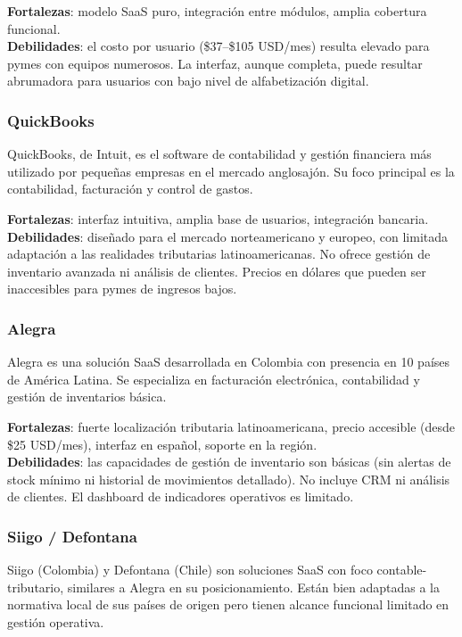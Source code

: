 \textbf{Fortalezas}: modelo SaaS puro, integración entre módulos, amplia cobertura funcional.\\
\textbf{Debilidades}: el costo por usuario (\$37--\$105 USD/mes) resulta elevado para pymes con equipos numerosos. La interfaz, aunque completa, puede resultar abrumadora para usuarios con bajo nivel de alfabetización digital.

\subsubsection{QuickBooks}\label{quickbooks}

QuickBooks, de Intuit, es el software de contabilidad y gestión financiera más utilizado por pequeñas empresas en el mercado anglosajón. Su foco principal es la contabilidad, facturación y control de gastos.

\textbf{Fortalezas}: interfaz intuitiva, amplia base de usuarios, integración bancaria.\\
\textbf{Debilidades}: diseñado para el mercado norteamericano y europeo, con limitada adaptación a las realidades tributarias latinoamericanas. No ofrece gestión de inventario avanzada ni análisis de clientes. Precios en dólares que pueden ser inaccesibles para pymes de ingresos bajos.

\subsubsection{Alegra}\label{alegra}

Alegra es una solución SaaS desarrollada en Colombia con presencia en 10 países de América Latina. Se especializa en facturación electrónica, contabilidad y gestión de inventarios básica.

\textbf{Fortalezas}: fuerte localización tributaria latinoamericana, precio accesible (desde \$25 USD/mes), interfaz en español, soporte en la región.\\
\textbf{Debilidades}: las capacidades de gestión de inventario son básicas (sin alertas de stock mínimo ni historial de movimientos detallado). No incluye CRM ni análisis de clientes. El dashboard de indicadores operativos es limitado.

\subsubsection{Siigo / Defontana}\label{siigo-defontana}

Siigo (Colombia) y Defontana (Chile) son soluciones SaaS con foco contable-tributario, similares a Alegra en su posicionamiento. Están bien adaptadas a la normativa local de sus países de origen pero tienen alcance funcional limitado en gestión operativa.

